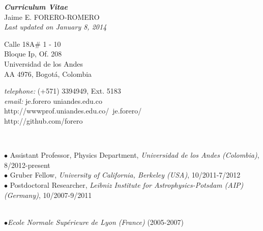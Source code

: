 \documentclass[10pt]{article}
\begin{document}
\noindent
\begin{center}
\emph{{\bf Curriculum Vitae}}\\
{{\Large\sc Jaime E. FORERO-ROMERO}}\\
\emph{Last updated on January 8, 2014}\\
\end{center}
\begin{minipage}{0.4\textwidth}
  \begin{flushleft}
    Calle 18A\# 1 - 10\\
    Bloque Ip, Of. 208\\
    Universidad de los Andes\\
    AA 4976, Bogot\'a, Colombia\\
  \end{flushleft}
\end{minipage}
\begin{minipage}{0.6\textwidth}
  \begin{flushright}
    {\it telephone:} (+571) 3394949, Ext. 5183\\
    {\it email:} je.forero uniandes.edu.co\\
    http://wwwprof.uniandes.edu.co/~je.forero/\\
    http://github.com/forero\\    
  \end{flushright}
\end{minipage}

\vspace{5mm}


\\
\noindent\makebox[\linewidth]{\rule{\textwidth}{0.4pt}}%

\noindent
$\bullet$ Assistant Professor, Physics Department, \emph{Universidad de los Andes (Colombia)}, 8/2012-present\\
$\bullet$ Gruber Fellow, \emph{University of California, Berkeley (USA)}, 10/2011-7/2012\\
$\bullet$  Postdoctoral Researcher, \emph{Leibniz Institute for
  Astrophysics-Potsdam (AIP) (Germany)}, 10/2007-9/2011  \\  



\\
\noindent\makebox[\linewidth]{\rule{\textwidth}{0.4pt}}%

\noindent$\bullet$\emph{Ecole Normale Sup\'erieure de Lyon (France)} (2005-2007)
\end{document}
